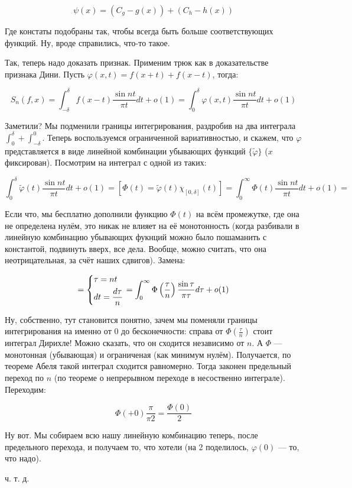 \documentclass{article}
\begin{document}
\[\psi(x) = (C_g - g(x)) + (C_h - h(x))\]

Где констаты подобраны так, чтобы всегда быть больше соответствующих функций. Ну, вроде справились, что-то такое.

Так, теперь надо доказать признак. Применим трюк как в доказательстве признака Дини. Пусть $\varphi(x, t) = f(x + t) + f(x - t)$, тогда:

\[S_n(f, x) = \int_{-\delta}^{\delta} f(x - t) \frac{\sin nt}{\pi t} dt + o(1) = \int_{0}^{\delta} \varphi(x, t) \frac{\sin nt}{\pi t} dt + o(1)\]

Заметили? Мы подменили границы интегрирования, раздробив на два интеграла $\int_{0}^{\delta} + \int_{-\delta}^{0}$. Теперь воспользуемся ограниченной вариативностью, и скажем, что $\varphi$ представляется в виде линейной комбинации убывающих функций $\{\tilde{\varphi}\}$ ($x$ фиксирован). Посмотрим на интеграл с одной из таких:

\[\int_{0}^{\delta} \tilde{\varphi}(t)\frac{\sin nt}{\pi t}dt + o(1) = [\Phi(t) = \tilde{\varphi}(t)\chi_{[0, \delta]}(t)] = \int_{0}^{\infty} \Phi(t) \frac{\sin nt}{\pi t} dt + o(1) = \]

Если что, мы бесплатно дополнили функцию $\Phi(t)$ на всём промежутке, где она не определена нулём, это никак не влияет на её монотонность (когда разбивали в линейную комбинацию убывающих фукнций можно было пошаманить с константой, подвинуть вверх, все дела. Вообще, можно считать, что она неотрицательная, за счёт наших сдвигов). Замена:

\[= \begin{dcases}
    \tau = nt \\
    dt = \frac{d\tau}{n}
\end{dcases} = \int_{0}^{\infty} \Phi\left(\frac{\tau}{n}\right) \frac{\sin \tau}{\pi \tau} d\tau + o(1)\]

Ну, собственно, тут становится понятно, зачем мы поменяли границы интегрирования на именно от 0 до бесконечности: справа от $\Phi\left(\frac{\tau}{n}\right)$ стоит интеграл Дирихле! Можно сказать, что он сходится независимо от $n$. А $\Phi$ --- монотонная (убывающая) и ограниченая (как минимум нулём). Получается, по теореме Абеля такой интеграл сходится равномерно. Тогда законен предельный переход по $n$ (по теореме о непрерывном переходе в несоственно интеграле). Переходим:

\[\Phi(+ 0) \frac{\pi}{\pi2} = \frac{\Phi(0)}{2}\]

Ну вот. Мы собираем всю нашу линейную комбинацию теперь, после предельного перехода, и получаем то, что хотели (на 2 поделилось, $\varphi(0)$ --- то, что надо).

ч. т. д. 
\end{document}
